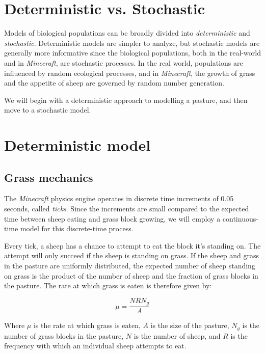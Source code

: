 \documentclass{article}
\theoremstyle{theorem}
\theoremstyle{definition}
\begin{document}
\section{Deterministic vs. Stochastic}

Models of biological populations can be broadly divided into \textit{deterministic} and \textit{stochastic}. Deterministic models are simpler to analyze, but stochastic models are generally more informative since the biological populations, both in the real-world and in \textit{Minecraft}, are stochastic processes. In the real world, populations are influenced by random ecological processes, and in \textit{Minecraft}, the growth of grass and the appetite of sheep are governed by random number generation.

We will begin with a deterministic approach to modelling a pasture, and then move to a stochastic model.

\section{Deterministic model}

\subsection{Grass mechanics}

The \textit{Minecraft} physics engine operates in discrete time increments of 0.05 seconds, called \textit{ticks}. Since the increments are small compared to the expected time between sheep eating and grass block growing, we will employ a continuous-time model for this discrete-time process.

Every tick, a sheep has a chance to attempt to eat the block it's standing on. The attempt will only succeed if the sheep is standing on grass. If the sheep and grass in the pasture are uniformly distributed, the expected number of sheep standing on grass is the product of the number of sheep and the fraction of grass blocks in the pasture. The rate at which grass is eaten is therefore given by:

\begin{equation}
    \label{sheep_eat}
    \mu=\frac{NRN_g}{A}
\end{equation}

Where $\mu$ is the rate at which grass is eaten, $A$ is the size of the pasture, $N_g$ is the number of grass blocks in the pasture, $N$ is the number of sheep, and $R$ is the frequency with which an individual sheep attempts to eat.
\end{document}
